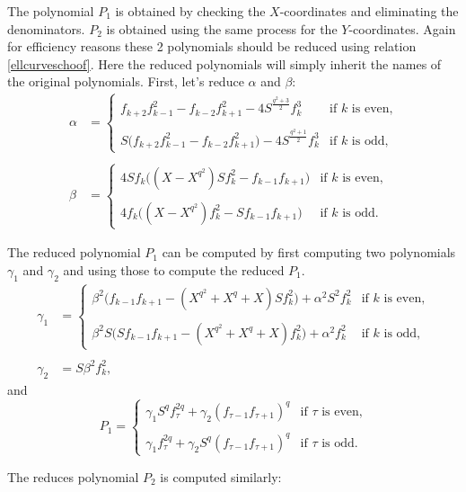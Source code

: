\documentclass{article}
\numberwithin{equation}{section}
\theoremstyle{definition}
\begin{document}
The polynomial $P_1$ is obtained by checking the $X$-coordinates and eliminating the denominators. $P_2$ is obtained using the same process for the $Y$-coordinates. Again for efficiency reasons these 2 polynomials should be reduced using relation \ref{ellcurveschoof}. Here the reduced polynomials will simply inherit the names of the original polynomials. First, let's reduce $\alpha$ and $\beta$:
\begin{align*}\alpha&=\left\{ \begin{array}{ll} f_{k+2}f_{k-1}^2 - f_{k-2}f_{k+1}^2 - 4S^{\frac{q^2+3}{2}} f_k^3 &\text{if $k$ is even,} \\ \\ S\big(f_{k+2}f_{k-1}^2 - f_{k-2}f_{k+1}^2\big) - 4S^{\frac{q^2+1}{2}} f_k^3 &\text{if $k$ is odd,}\end{array}\\ \\
\beta&=\left\{ \begin{array}{ll} 4Sf_k\big((X-X^{q^2})Sf_k^2-f_{k-1}f_{k+1}\big) &\text{if $k$ is even,} \\ \\ 4f_k\big((X-X^{q^2})f_k^2-Sf_{k-1}f_{k+1}\big) &\text{if $k$ is odd.} \end{array}\end{align*}

The reduced polynomial $P_1$ can be computed by first computing two polynomials $\gamma_1$ and $\gamma_2$ and using those to compute the reduced $P_1$. 
\begin{align*}
\gamma_1 &= \left\{ \begin{array}{ll} \beta^2 \big(f_{k-1}f_{k+1} - (X^{q^2}+X^q+X) S f_k^2 \big) + \alpha^2 S^2 f_k^2 &\text{if $k$ is even,}\\ \\
\beta^2S\big( S f_{k-1}f_{k+1}-(X^{q^2}+X^q+X)f_k^2\big) + \alpha^2 f_k^2 &\text{if $k$ is odd,} 
\end{array}\\ \\
\gamma_2 &= S\beta^2f_k^2,
\end{align*}
and
$$P_1=\left\{ \begin{array}{ll} \gamma_1S^qf_\tau^{2q}+\gamma_2(f_{\tau-1}f_{\tau+1})^q &\text{if $\tau$ is even,}\\ \\ \gamma_1f_\tau^{2q} + \gamma_2S^q (f_{\tau-1}f_{\tau+1})^q &\text{if $\tau$ is odd.} \end{array}$$

The reduces polynomial $P_2$ is computed similarly:
\end{document}
